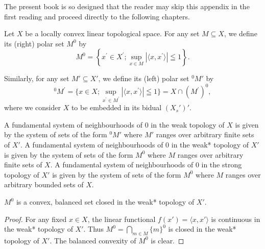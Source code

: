 \label{chap:AV}

The present book is so designed that the reader may skip this appendix in the first reading and proceed directly to the following chapters. 


\label{sec:AV.1}

\begin{definitionu} Let $X$ be a locally convex linear topological space. For any set $M \subseteq X$, we define its (right) polar set $M^0$ by 
\begin{equation}\label{eq:AV.1.1}
M ^{0} = \left\{x ^{\prime} \in X ^{\prime}; \sup\limits _{x \in M} | \langle x, x ^{\prime} \rangle | \leqq 1 \right\}.
\end{equation}
\end{definitionu}

Similarly, for any set $M' \subseteq X'$, we define its (left) polar set $^0M'$ by 
\begin{equation}\label{eq:AV.1.2}
{ } ^{0} M ^{ \prime } = \{ x \in X ; \operatorname* { s u p } _ { x ^{ \prime } \in M ^{ \prime } } | \langle x , x ^{ \prime } \rangle | \leqq 1 \} = X \cap ( M ^{ \prime } ) ^{0} ,
\end{equation}
where we consider $X$ to be embedded in its bidual $(X_s')'$. 

A fundamental system of neighbourhoods of $0$ in the weak topology of $X$ is given by the system of sets of the form $^{0}M'$ where $M'$ ranges over arbitrary finite sets of $X'$. A fundamental system of neighbourhoods of $0$ in the weak* topology of $X'$ is given by the system of sets of the form $M^{0}$ where $M$ ranges over arbitrary finite sets of $X$. A fundamental system of neighbourhoods of $0$ in the strong topology of $X'$ is given by the system of sets of the form $M^{0}$ where $M$ ranges over arbitrary bounded sets of $X$. 

\begin{propositionu} $M^{0}$ is a convex, balanced set closed in the weak* topology of $X'$. 
\end{propositionu}

\begin{proof}
 For any fixed $x \in X$, the linear functional $f(x') = \langle x, x' \rangle$ is continuous in the weak* topology of $X'$. Thus $M^0 = \bigcap\limits_{m \in M} \{m\}^0$ is closed in the weak* topology of $X'$. The balanced convexity of $M^0$ is clear. 
\end{proof}

